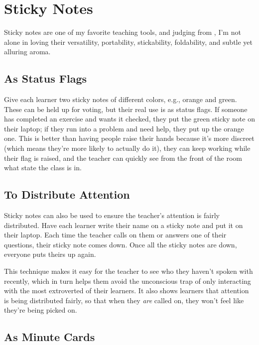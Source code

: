 \section{Sticky Notes}\label{s:classroom-sticky-notes}

Sticky notes are one of my favorite teaching tools, and judging from
\cite{Ward2015}, I'm not alone in loving their versatility,
portability, stickability, foldability, and subtle yet alluring aroma.

\subsection*{As Status Flags}

Give each learner two sticky notes of different colors, e.g., orange and
green. These can be held up for voting, but their real use is as status
flags. If someone has completed an exercise and wants it checked, they
put the green sticky note on their laptop; if they run into a problem
and need help, they put up the orange one. This is better than having
people raise their hands because it's more discreet (which means they're
more likely to actually do it), they can keep working while their flag
is raised, and the teacher can quickly see from the front of the room
what state the class is in.

\subsection*{To Distribute Attention}

Sticky notes can also be used to ensure the teacher's attention is
fairly distributed. Have each learner write their name on a sticky note
and put it on their laptop. Each time the teacher calls on them or
answers one of their questions, their sticky note comes down. Once all
the sticky notes are down, everyone puts theirs up again.

This technique makes it easy for the teacher to see who they haven't
spoken with recently, which in turn helps them avoid the unconscious
trap of only interacting with the most extroverted of their learners. It
also shows learners that attention is being distributed fairly, so that
when they \emph{are} called on, they won't feel like they're being picked on.

\subsection*{As Minute Cards}

